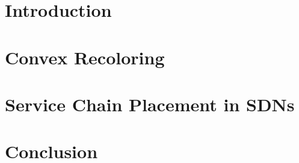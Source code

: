 \newcommand{\defpath}[1]{\def\path{content/#1}}
\newcommand{\add}[1]{}

\chapter{Introduction}
\defpath{introduction}
\add{introduction}

\chapter{Convex Recoloring}
\defpath{2cr}
\add{2cr}

\chapter{Service Chain Placement in SDNs}
\defpath{vpn}
\add{vpn}

\chapter{Conclusion}
\defpath{conclusion}
\add{conclusion}